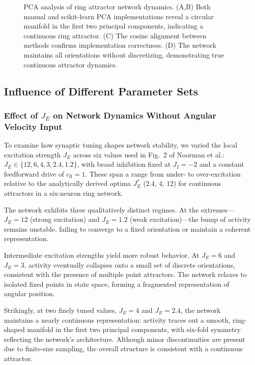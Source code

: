 \documentclass[11pt,a4paper]{article}
\begin{document}
\begin{figure}[H]
\caption{PCA analysis of ring attractor network dynamics. (A,B) Both manual and scikit-learn PCA implementations reveal a circular manifold in the first two principal components, indicating a continuous ring attractor. (C) The cosine alignment between methods confirms implementation correctness. (D) The network maintains all orientations without discretizing, demonstrating true continuous attractor dynamics.}
\label{fig:pca_analysis}
\end{figure}


\subsection{Influence of Different Parameter Sets}

\subsubsection*{Effect of \( J_E \) on Network Dynamics Without Angular Velocity Input}

To examine how synaptic tuning shapes network stability, we varied the local excitation strength \( J_E \) across six values used in Fig.~2 of Noorman et al.: \( J_E \in \{12, 6, 4, 3, 2.4, 1.2\} \), with broad inhibition fixed at \( J_I = -2 \) and a constant feedforward drive of \( c_{\text{ff}} = 1 \). These span a range from under- to over-excitation relative to the analytically derived optima \( J_E^\ast \) (2.4, 4, 12) for continuous attractors in a six-neuron ring network.

The network exhibits three qualitatively distinct regimes. At the extremes—\( J_E = 12 \) (strong excitation) and \( J_E = 1.2 \) (weak excitation)—the bump of activity remains unstable, failing to converge to a fixed orientation or maintain a coherent representation. 

Intermediate excitation strengths yield more robust behavior. At \( J_E = 6 \) and \( J_E = 3 \), activity eventually collapses onto a small set of discrete orientations, consistent with the presence of multiple point attractors. The network relaxes to isolated fixed points in state space, forming a fragmented representation of angular position.

Strikingly, at two finely tuned values, \( J_E = 4 \) and \( J_E = 2.4 \), the network maintains a nearly continuous representation: activity traces out a smooth, ring-shaped manifold in the first two principal components, with six-fold symmetry reflecting the network’s architecture. Although minor discontinuities are present due to finite-size sampling, the overall structure is consistent with a continuous attractor.
\end{document}
